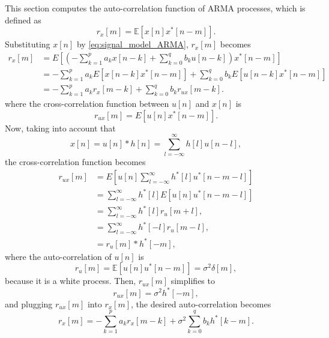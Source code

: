 This section computes the auto-correlation function of ARMA processes, which is defined as
\begin{equation}
	r_{x}[m] = \mathbb{E}[x[n] x^{\ast}[n-m]].
\end{equation}
Substituting $x[n]$ by \eqref{eq:signal_model_ARMA}, $r_{x}[m]$ becomes
\begin{align}
r_{x}[m] &= E\left[ \left(- \sum_{k = 1}^{p} a_k x[n -k]  + \sum_{k = 0}^{q} b_k u[n-k] \right) x^{\ast}[n-m]\right] \nonumber \\
&=  - \sum_{k = 1}^{p} a_k E\left[x[n -k] x^{\ast}[n-m]\right] + \sum_{k = 0}^{q} b_k  E\left[u[n-k]  x^{\ast}[n-m]\right] \nonumber \\
&=  - \sum_{k = 1}^{p} a_k r_{x}[m-k] + \sum_{k = 0}^{q} b_k  r_{ux}[m-k].
\end{align}
where the cross-correlation function between $u[n]$ and $x[n]$ is
\begin{equation}
r_{ux}[m] =   E\left[u[n]  x^{\ast}[n-m]\right].
\end{equation}
Now, taking into account that
\begin{equation}
x[n] = u[n] \ast h[n] = \sum_{l = -\infty}^{\infty} h[l] u[n-l],
\end{equation}
the cross-correlation function becomes
\begin{align}
r_{ux}[m] &=   E\left[u[n]  \sum_{l = -\infty}^{\infty} h^{\ast}[l] u^{\ast}[n-m-l]\right] \nonumber \\
&=   \sum_{l = -\infty}^{\infty} h^{\ast}[l] E\left[u[n]   u^{\ast}[n-m-l]\right] \nonumber \\
&=   \sum_{l = -\infty}^{\infty} h^{\ast}[l] r_u [m+l], \nonumber \\
&=   \sum_{l = -\infty}^{\infty} h^{\ast}[-l] r_u [m-l], \nonumber \\
&=   r_u [m] \ast h^{\ast}[-m],
\end{align}
where the auto-correlation of $u[n]$ is
\begin{equation}
r_{u}[m] = \mathbb{E}[u[n] u^{\ast}[n-m]] = \sigma^2 \delta[m],
\end{equation}
because it is a white process. Then, $r_{ux}[m]$ simplifies to
\begin{equation}
r_{ux}[m] =  \sigma^2 h^{\ast}[-m],
\end{equation}
and plugging $r_{ux}[m]$ into $r_{x}[m]$, the desired auto-correlation becomes
\begin{equation}
r_{x}[m] =  - \sum_{k = 1}^{p} a_k r_{x}[m-k] + \sigma^2 \sum_{k = 0}^{q} b_k  h^{\ast}[k-m].
\end{equation}
